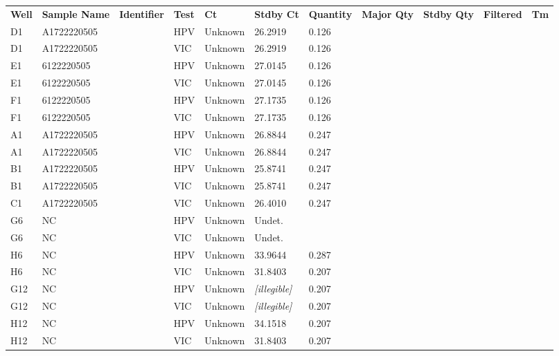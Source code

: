 \documentclass[UTF8,10pt,a4paper,fontset=fandol]{ctexart}
\begin{document}
\vspace{0.5em}

\begin{center}
\begin{tabular}{@{}p{0.45in}p{1.25in}p{0.85in}p{0.55in}p{0.72in}p{0.72in}p{0.72in}p{0.72in}p{0.72in}p{0.72in}p{0.45in}@{}}
\textbf{Well} & \textbf{Sample Name} & \textbf{Identifier} & \textbf{Test} & \textbf{Ct} & \textbf{Stdby Ct} & \textbf{Quantity} & \textbf{Major Qty} & \textbf{Stdby Qty} & \textbf{Filtered} & \textbf{Tm} \\
D1 & A1722220505 & & HPV & Unknown & 26.2919 & 0.126 & & & & \\
D1 & A1722220505 & & VIC & Unknown & 26.2919 & 0.126 & & & & \\
E1 & 6122220505 & & HPV & Unknown & 27.0145 & 0.126 & & & & \\
E1 & 6122220505 & & VIC & Unknown & 27.0145 & 0.126 & & & & \\
F1 & 6122220505 & & HPV & Unknown & 27.1735 & 0.126 & & & & \\
F1 & 6122220505 & & VIC & Unknown & 27.1735 & 0.126 & & & & \\
A1 & A1722220505 & & HPV & Unknown & 26.8844 & 0.247 & & & & \\
A1 & A1722220505 & & VIC & Unknown & 26.8844 & 0.247 & & & & \\
B1 & A1722220505 & & HPV & Unknown & 25.8741 & 0.247 & & & & \\
B1 & A1722220505 & & VIC & Unknown & 25.8741 & 0.247 & & & & \\
C1 & A1722220505 & & VIC & Unknown & 26.4010 & 0.247 & & & & \\
G6 & NC & & HPV & Unknown & Undet. & & & & & \\
G6 & NC & & VIC & Unknown & Undet. & & & & & \\
H6 & NC & & HPV & Unknown & 33.9644 & 0.287 & & & & \\
H6 & NC & & VIC & Unknown & 31.8403 & 0.207 & & & & \\
G12 & NC & & HPV & Unknown & \textit{[illegible]} & 0.207 & & & & \\
G12 & NC & & VIC & Unknown & \textit{[illegible]} & 0.207 & & & & \\
H12 & NC & & HPV & Unknown & 34.1518 & 0.207 & & & & \\
H12 & NC & & VIC & Unknown & 31.8403 & 0.207 & & & & \\
\end{tabular}
\end{center}
\end{document}
